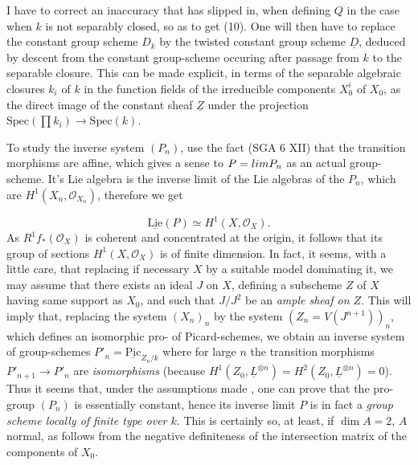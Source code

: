 \documentclass[11pt,a4paper]{article}
\begin{document}
I have to correct an inaccuracy that has slipped in, when defining $Q$ in the
case when $k$ is not separably closed, so as to get (10). One will then have
to replace the constant group scheme $D_k$ by the twisted constant group
scheme $\underline{D}$, deduced by descent from the constant group-scheme
occuring after passage from $k$ to the separable closure.
 This can be made explicit, in terms of
the separable algebraic closures $k_i$ of $k$ in the function fields of the
irreducible components $X_0^i$ of $X_0$, as the  direct image of the constant sheaf $\underline{Z}$ under the
projection $\mathrm{Spec}(\prod k_i) \to \mathrm{Spec}(k)$.

To study the inverse system $(P_n)$, use the fact (SGA 6 XII) that the
transition morphisms are affine, which gives a sense to
$P = \varprojlim P_n$ as an actual group-scheme. It's Lie algebra is the
inverse limit of the Lie algebras of the $P_n$, which are
$H^1(X_n, \mathcal{O}_{X_n})$, therefore we get

\begin{equation*}
\tag{11} \underline{\mathrm{Lie}}(P) \simeq H^1(X, \mathcal{O}_X) .
\end{equation*}
As $R^1 f_*(\mathcal{O}_X)$ is coherent and concentrated at the origin, it
follows that its group of sections $H^1(X, \mathcal{O}_X)$ is of finite
dimension. In fact, it seems, with a little care, that replacing if necessary
$X$ by a suitable model dominating it, we may assume that there exists an
 ideal $J$ on $X$, defining a subscheme $Z$ of $X$ having same
support as $X_0$, and such that  $J/J^2$ be an
\emph{ample sheaf on $Z$}. This will imply that, replacing the system
$(X_n)_{n}$ by the system $(Z_n = V(J^{n+1}))_{n}$, which defines an
isomorphic pro-  of Picard-schemes, we obtain an
inverse system of group-schemes $P'_n = \underline{\mathrm{Pic}}_{Z_n/k}$
where for large $n$ the transition morphisms $P'_{n+1} \to P'_n$ are
\emph{isomorphisms} (because
$H^1(Z_0, \underline{L}^{\otimes n}) = H^2(Z_0, \underline{L}^{\otimes n}) = 0$).
Thus it seems that, under the assumptions made , one can
prove that the pro-group $(P_n)$ is essentially constant, hence its inverse
limit $P$ is in fact a \emph{group scheme locally of finite type over $k$}.
This is certainly so, at least, if $\dim A = 2$, $A$ normal, as follows from
the negative definiteness of the intersection matrix of the components of
$X_0$.
\end{document}
